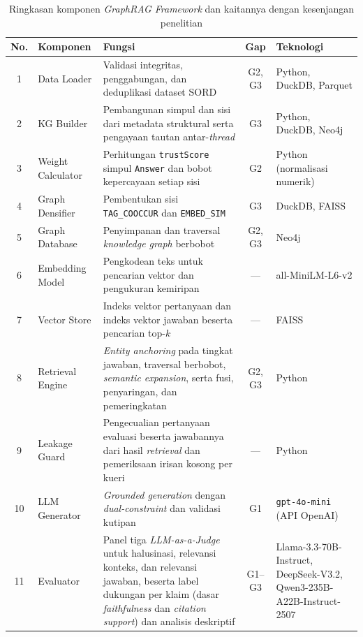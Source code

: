 \begin{table}[!htbp]
\centering
\small
\caption{Ringkasan komponen \emph{GraphRAG Framework} dan kaitannya dengan kesenjangan penelitian}
\label{tab:ringkasan-komponen}

\begin{tabularx}{\textwidth}
{|c|>{\raggedright\arraybackslash}p{2.5cm}|>{\raggedright\arraybackslash}X|c|>{\raggedright\arraybackslash}p{3.0cm}|}
\hline
\textbf{No.} &
\textbf{Komponen} &
\textbf{Fungsi} &
\textbf{Gap} &
\textbf{Teknologi} \\
\hline

1 &
Data Loader &
Validasi integritas, penggabungan, dan deduplikasi dataset SORD &
G2, G3 &
Python, DuckDB, Parquet \\
\hline

2 &
KG Builder &
Pembangunan simpul dan sisi dari metadata struktural serta pengayaan tautan antar-\emph{thread} &
G3 &
Python, DuckDB, Neo4j \\
\hline

3 &
Weight Calculator &
Perhitungan \texttt{trustScore} simpul \texttt{Answer} dan bobot kepercayaan setiap sisi &
G2 &
Python (normalisasi numerik) \\
\hline

4 &
Graph Densifier &
Pembentukan sisi \texttt{TAG\_COOCCUR} dan \texttt{EMBED\_SIM} &
G3 &
DuckDB, FAISS \\
\hline

5 &
Graph Database &
Penyimpanan dan traversal \emph{knowledge graph} berbobot &
G2, G3 &
Neo4j \\
\hline

6 &
Embedding Model &
Pengkodean teks untuk pencarian vektor dan pengukuran kemiripan &
--- &
all-MiniLM-L6-v2 \\
\hline

7 &
Vector Store &
Indeks vektor pertanyaan dan indeks vektor jawaban beserta pencarian top-$k$ &
--- &
FAISS \\
\hline

8 &
Retrieval Engine &
\emph{Entity anchoring} pada tingkat jawaban, traversal berbobot, \emph{semantic expansion}, serta fusi, penyaringan, dan pemeringkatan &
G2, G3 &
Python \\
\hline

9 &
Leakage Guard &
Pengecualian pertanyaan evaluasi beserta jawabannya dari hasil \emph{retrieval} dan pemeriksaan irisan kosong per kueri &
--- &
Python \\
\hline

10 &
LLM Generator &
\emph{Grounded generation} dengan \emph{dual-constraint} dan validasi kutipan &
G1 &
\texttt{gpt-4o-mini} (API OpenAI) \\
\hline

11 &
Evaluator &
Panel tiga \emph{LLM-as-a-Judge} untuk halusinasi, relevansi konteks, dan relevansi jawaban, beserta label dukungan per klaim (dasar \emph{faithfulness} dan \emph{citation support}) dan analisis deskriptif &
G1--G3 &
Llama-3.3-70B-Instruct, DeepSeek-V3.2, Qwen3-235B-A22B-Instruct-2507 \\
\hline

\end{tabularx}
\end{table}